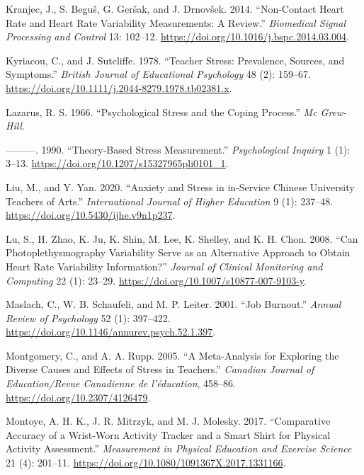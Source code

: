\documentclass[preprint,
3p]{elsarticle} %
\newlength{\cslhangindent}
\newenvironment{CSLReferences}[2] %
 {\begin{list}{}{%
  \setlength{\itemindent}{0pt}
  \setlength{\leftmargin}{0pt}
  \setlength{\parsep}{0pt}
  \ifodd #1
   \setlength{\leftmargin}{\cslhangindent}
   \setlength{\itemindent}{-1\cslhangindent}
  \fi
  \setlength{\itemsep}{#2\baselineskip}}}
 {\end{list}}
\begin{document}
\begin{CSLReferences}{1}{0}
Kranjec, J., S. Beguš, G. Geršak, and J. Drnovšek. 2014. {``Non-Contact
Heart Rate and Heart Rate Variability Measurements: A Review.''}
\emph{Biomedical Signal Processing and Control} 13: 102--12.
\url{https://doi.org/10.1016/j.bspc.2014.03.004}.

Kyriacou, C., and J. Sutcliffe. 1978. {``Teacher Stress: Prevalence,
Sources, and Symptoms.''} \emph{British Journal of Educational
Psychology} 48 (2): 159--67.
\url{https://doi.org/10.1111/j.2044-8279.1978.tb02381.x}.

Lazarus, R. S. 1966. {``Psychological Stress and the Coping Process.''}
\emph{Mc Grew-Hill}.

---------. 1990. {``Theory-Based Stress Measurement.''}
\emph{Psychological Inquiry} 1 (1): 3--13.
\url{https://doi.org/10.1207/s15327965pli0101_1}.

Liu, M., and Y. Yan. 2020. {``Anxiety and Stress in in-Service Chinese
University Teachers of Arts.''} \emph{International Journal of Higher
Education} 9 (1): 237--48. \url{https://doi.org/10.5430/ijhe.v9n1p237}.

Lu, S., H. Zhao, K. Ju, K. Shin, M. Lee, K. Shelley, and K. H. Chon.
2008. {``Can Photoplethysmography Variability Serve as an Alternative
Approach to Obtain Heart Rate Variability Information?''} \emph{Journal
of Clinical Monitoring and Computing} 22 (1): 23--29.
\url{https://doi.org/10.1007/s10877-007-9103-y}.

Maslach, C., W. B. Schaufeli, and M. P. Leiter. 2001. {``Job Burnout.''}
\emph{Annual Review of Psychology} 52 (1): 397--422.
\url{https://doi.org/10.1146/annurev.psych.52.1.397}.

Montgomery, C., and A. A. Rupp. 2005. {``A Meta-Analysis for Exploring
the Diverse Causes and Effects of Stress in Teachers.''} \emph{Canadian
Journal of Education/Revue Canadienne de l'{é}ducation}, 458--86.
\url{https://doi.org/10.2307/4126479}.

Montoye, A. H. K., J. R. Mitrzyk, and M. J. Molesky. 2017.
{``Comparative Accuracy of a Wrist-Worn Activity Tracker and a Smart
Shirt for Physical Activity Assessment.''} \emph{Measurement in Physical
Education and Exercise Science} 21 (4): 201--11.
\url{https://doi.org/10.1080/1091367X.2017.1331166}.


\end{CSLReferences}
\end{document}
